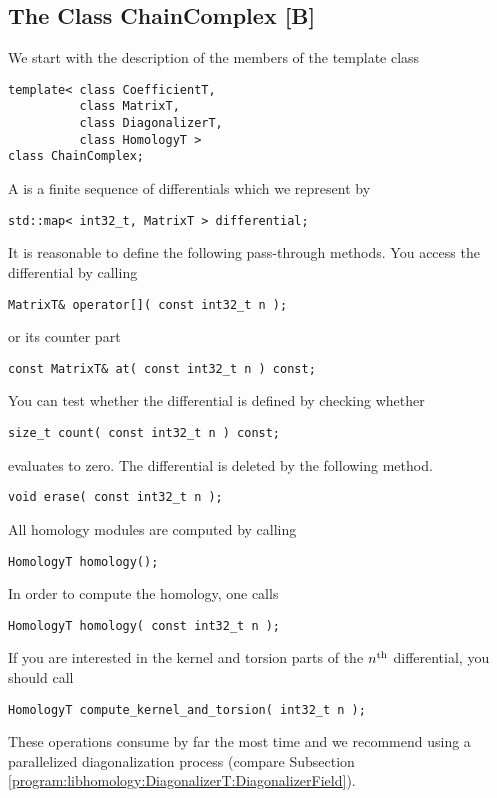\subsection{The Class ChainComplex [B]}
\label{program:libhomology:ChainComplex}

We start with the description of the members of the template class
\begin{lstlisting}
template< class CoefficientT,
          class MatrixT,
          class DiagonalizerT,
          class HomologyT >
class ChainComplex;
\end{lstlisting}
A  is a finite sequence of differentials which we represent by
\begin{lstlisting}
std::map< int32_t, MatrixT > differential;
\end{lstlisting}
It is reasonable to define the following pass-through methods.
You access the \nth differential by calling
\begin{lstlisting}
MatrixT& operator[]( const int32_t n );
\end{lstlisting}
or its  counter part
\begin{lstlisting}
const MatrixT& at( const int32_t n ) const;
\end{lstlisting}
You can test whether the \nth differential is defined by checking whether
\begin{lstlisting}
size_t count( const int32_t n ) const;
\end{lstlisting}
evaluates to zero.
The \nth differential is deleted by the following method.
\begin{lstlisting}
void erase( const int32_t n );
\end{lstlisting}
All homology modules are computed by calling
\begin{lstlisting}
HomologyT homology();
\end{lstlisting}
In order to compute the \nth homology, one calls
\begin{lstlisting}
HomologyT homology( const int32_t n );
\end{lstlisting}
If you are interested in the kernel and torsion parts of the $n^{\text{th}}$ differential, you should call
\begin{lstlisting}
HomologyT compute_kernel_and_torsion( int32_t n );
\end{lstlisting}
These operations consume by far the most time and 
we recommend using a parallelized diagonalization process (compare Subsection \ref{program:libhomology:DiagonalizerT:DiagonalizerField}).

